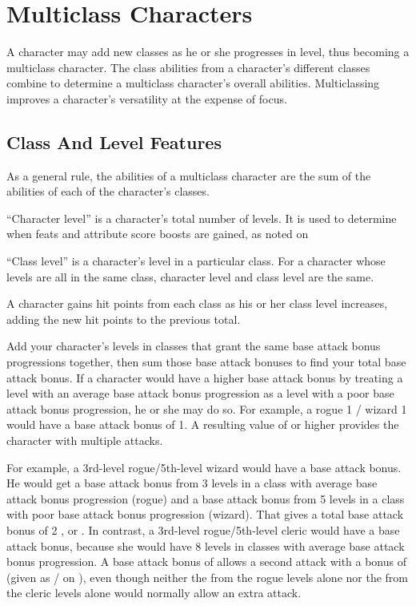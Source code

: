  \section{Multiclass Characters}
A character may add new classes as he or she progresses in level, thus becoming a multiclass character. The class abilities from a character's different classes combine to determine a multiclass character's overall abilities. Multiclassing improves a character's versatility at the expense of focus.

 \subsection{Class And Level Features}
As a general rule, the abilities of a multiclass character are the sum
of the abilities of each of the character's classes.

 ``Character level'' is a character's total number of levels. It is
used to determine when feats and attribute score boosts are gained, as
noted on 

\par ``Class level'' is a character's level in a particular class. For a
character whose levels are all in the same class, character level and
class level are the same.

 A character gains hit points from each class as his or
her class level increases, adding the new hit points to the previous
total.

  Add your character's levels in classes that grant
the same base attack bonus progressions together, then sum those
base attack bonuses to find your total base attack bonus. If a character would have a higher base attack bonus by treating a level with an average base attack bonus progression as a level with a poor base attack bonus progression, he or she may do so. For example, a rogue 1 / wizard 1 would have a base attack bonus of 1. A resulting value
of  or higher provides the character with multiple attacks.

\par For example, a 3rd-level rogue/5th-level wizard would have a  base attack bonus. He would get a  base attack bonus from 3 levels in a class with average base attack bonus progression (rogue) and a  base attack bonus from 5 levels in a class with poor base attack bonus progression (wizard). That gives a total base attack bonus of 2 , or . In contrast, a 3rd-level rogue/5th-level cleric would have a  base attack bonus, because she would have 8 levels in classes with average base attack bonus progression. A base attack bonus of  allows a second attack with a bonus of  (given as / on ), even though neither the  from the rogue levels alone nor the  from the cleric levels alone would normally allow an extra attack.

